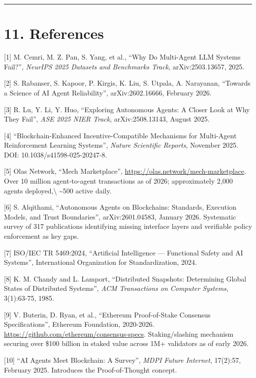 \documentclass[
  10pt,
]{article}
\begin{document}
\begin{center}\rule{0.5\linewidth}{0.5pt}\end{center}

\hypertarget{references}{%
\section{11. References}\label{references}}

{[}1{]} M. Cemri, M. Z. Pan, S. Yang, et al., ``Why Do Multi-Agent LLM
Systems Fail?'', \emph{NeurIPS 2025 Datasets and Benchmarks Track},
arXiv:2503.13657, 2025.

{[}2{]} S. Rabanser, S. Kapoor, P. Kirgis, K. Liu, S. Utpala, A.
Narayanan, ``Towards a Science of AI Agent Reliability'',
arXiv:2602.16666, February 2026.

{[}3{]} R. Lu, Y. Li, Y. Huo, ``Exploring Autonomous Agents: A Closer
Look at Why They Fail'', \emph{ASE 2025 NIER Track}, arXiv:2508.13143,
August 2025.

{[}4{]} ``Blockchain-Enhanced Incentive-Compatible Mechanisms for
Multi-Agent Reinforcement Learning Systems'', \emph{Nature Scientific
Reports}, November 2025. DOI: 10.1038/s41598-025-20247-8.

{[}5{]} Olas Network, ``Mech Marketplace'',
\url{https://olas.network/mech-marketplace}. Over 10 million
agent-to-agent transactions as of 2026; approximately 2,000 agents
deployed,\textbackslash{} \textasciitilde500 active daily.

{[}6{]} S. Alqithami, ``Autonomous Agents on Blockchains: Standards,
Execution Models, and Trust Boundaries'', arXiv:2601.04583, January
2026. Systematic survey of 317 publications identifying missing
interface layers and verifiable policy enforcement as key gaps.

{[}7{]} ISO/IEC TR 5469:2024, ``Artificial Intelligence --- Functional
Safety and AI Systems'', International Organization for Standardization,
2024.

{[}8{]} K. M. Chandy and L. Lamport, ``Distributed Snapshots:
Determining Global States of Distributed Systems'', \emph{ACM
Transactions on Computer Systems}, 3(1):63-75, 1985.

{[}9{]} V. Buterin, D. Ryan, et al., ``Ethereum Proof-of-Stake Consensus
Specifications'', Ethereum Foundation, 2020-2026.
\url{https://github.com/ethereum/consensus-specs}. Staking/slashing
mechanism securing over \$100 billion in staked value across 1M+
validators as of early 2026.

{[}10{]} ``AI Agents Meet Blockchain: A Survey'', \emph{MDPI Future
Internet}, 17(2):57, February 2025. Introduces the Proof-of-Thought
concept.
\end{document}
